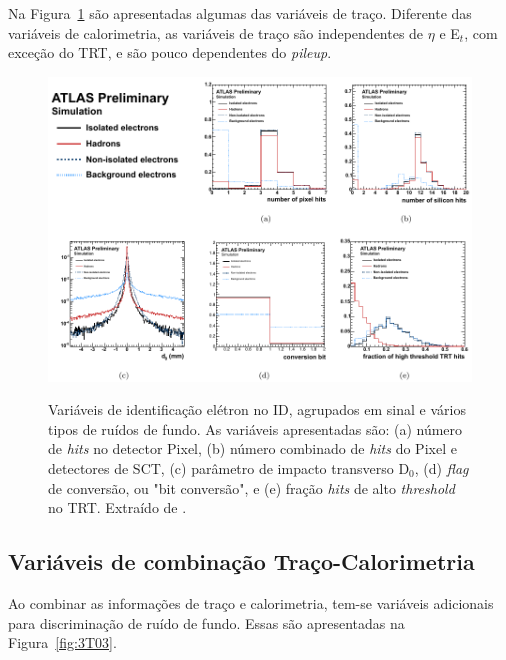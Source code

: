 Na Figura~\ref{fig:3T02} são apresentadas algumas das variáveis de traço. Diferente das variáveis de calorimetria, as variáveis de traço são independentes de $\eta$ e E${_t}$, com exceção do TRT, e são pouco dependentes do \emph{pileup}.

\begin{figure}[h!]
	\centering
	\includegraphics[width=14cm]{./textuais/identificacao/figuras/fig_2_variaveis_eletron.pdf}\\
	\caption{Variáveis de identificação elétron no ID, agrupados em sinal e vários tipos de ruídos de fundo. As variáveis apresentadas são: (a) número de \emph{hits} no detector Pixel, (b) número combinado de \emph{hits} do Pixel e detectores de SCT, (c) parâmetro de impacto transverso D${_0}$, (d) \emph{flag} de conversão, ou "bit conversão", e (e) fração \emph{hits} de alto \emph{threshold} no TRT. Extraído de \cite{alison2014road}.}
	\label{fig:3T02}
\end{figure}

\subsection{Variáveis de combinação Traço-Calorimetria}

Ao combinar as informações de traço e calorimetria, tem-se variáveis adicionais para discriminação de ruído de fundo. Essas são apresentadas na Figura~\ref{fig:3T03}.

